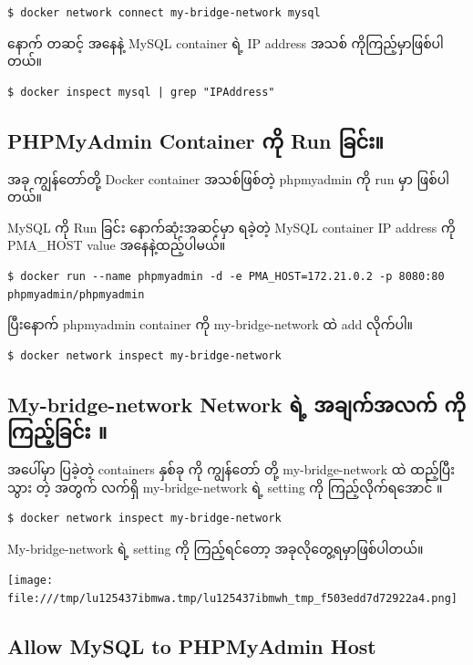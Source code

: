 \documentclass{article}
\begin{document}
\begin{verbatim}
$ docker network connect my-bridge-network mysql
\end{verbatim}

နောက် တဆင့် အနေနဲ့ MySQL container ရဲ့ IP address အသစ်
ကိုကြည့်မှာဖြစ်ပါတယ်။

\begin{verbatim}
$ docker inspect mysql | grep "IPAddress"
\end{verbatim}

\subsection{PHPMyAdmin Container ကို Run
ခြင်း။}\label{phpmyadmin-container--run-}

အခု ကျွန်တော်တို့ Docker container အသစ်ဖြစ်တဲ့ phpmyadmin ကို run မှာ
ဖြစ်ပါတယ်။

MySQL ကို Run ခြင်း နောက်ဆုံးအဆင့်မှာ ရခဲ့တဲ့ MySQL container IP address
ကို PMA\_HOST value အနေနဲ့ထည့်ပါမယ်။

\begin{verbatim}
$ docker run --name phpmyadmin -d -e PMA_HOST=172.21.0.2 -p 8080:80 phpmyadmin/phpmyadmin
\end{verbatim}

ပြီးနောက် phpmyadmin container ကို my-bridge-network ထဲ add လိုက်ပါ။

\begin{verbatim}
$ docker network inspect my-bridge-network
\end{verbatim}

\subsection{My-bridge-network Network ရဲ့ အချက်အလက် ကိုကြည့်ခြင်း
။}\label{my-bridge-network-network---}

အပေါ်မှာ ပြခဲ့တဲ့ containers နှစ်ခု ကို ကျွန်တော် တို့ my-bridge-network
ထဲ ထည့်ပြီးသွား တဲ့ အတွက် လက်ရှိ my-bridge-network ရဲ့ setting ကို
ကြည့်လိုက်ရအောင် ။

\begin{verbatim}
$ docker network inspect my-bridge-network
\end{verbatim}

My-bridge-network ရဲ့ setting ကို ကြည့်ရင်တော့ အခုလိုတွေ့ရမှာဖြစ်ပါတယ်။

\texttt{[image: file:///tmp/lu125437ibmwa.tmp/lu125437ibmwh\_tmp\_f503edd7d72922a4.png]}

\subsection{Allow MySQL to PHPMyAdmin
Host}\label{allow-mysql-to-phpmyadmin-host}
\end{document}
